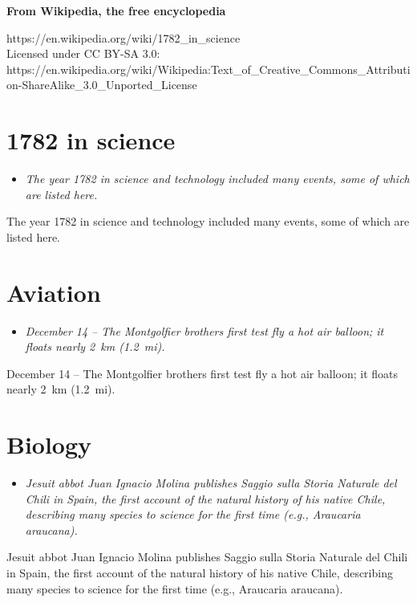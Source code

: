 \textbf{From Wikipedia, the free encyclopedia}

https://en.wikipedia.org/wiki/1782\_in\_science\\
Licensed under CC BY-SA 3.0:\\
https://en.wikipedia.org/wiki/Wikipedia:Text\_of\_Creative\_Commons\_Attribution-ShareAlike\_3.0\_Unported\_License

\section{1782 in science}\label{in-science}

\begin{itemize}
\item
  \emph{The year 1782 in science and technology included many events,
  some of which are listed here.}
\end{itemize}

The year 1782 in science and technology included many events, some of
which are listed here.

\section{Aviation}\label{aviation}

\begin{itemize}
\item
  \emph{December 14 -- The Montgolfier brothers first test fly a hot air
  balloon; it floats nearly 2~km (1.2~mi).}
\end{itemize}

December 14 -- The Montgolfier brothers first test fly a hot air
balloon; it floats nearly 2~km (1.2~mi).

\section{Biology}\label{biology}

\begin{itemize}
\item
  \emph{Jesuit abbot Juan Ignacio Molina publishes Saggio sulla Storia
  Naturale del Chili in Spain, the first account of the natural history
  of his native Chile, describing many species to science for the first
  time (e.g., Araucaria araucana).}
\end{itemize}

Jesuit abbot Juan Ignacio Molina publishes Saggio sulla Storia Naturale
del Chili in Spain, the first account of the natural history of his
native Chile, describing many species to science for the first time
(e.g., Araucaria araucana).

